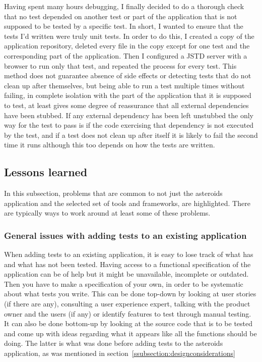\documentclass[11pt]{article}
\begin{document}
Having spent many hours debugging, I finally decided to do a thorough check that no test depended on another test or part of the application that is not supposed to be tested by a specific test. In short, I wanted to ensure that the tests I'd written were truly unit tests. In order to do this, I created a copy of the application repository, deleted every file in the copy except for one test and the corresponding part of the application. Then I configured a JSTD server with a browser to run only that test, and repeated the process for every test. This method does not guarantee absence of side effects or detecting tests that do not clean up after themselves, but being able to run a test multiple times without failing, in complete isolation with the part of the application that it is supposed to test, at least gives some degree of reassurance that all external dependencies have been stubbed. If any external dependency has been left unstubbed the only way for the test to pass is if the code exercising that dependency is not executed by the test, and if a test does not clean up after itself it is likely to fail the second time it runs although this too depends on how the tests are written.

\subsection{Lessons learned}

In this subsection, problems that are common to not just the asteroids application and the selected set of tools and frameworks, are highlighted. There are typically ways to work around at least some of these problems.

\subsubsection{General issues with adding tests to an existing application}

When adding tests to an existing application, it is easy to lose track of what has and what has not been tested. Having access to a functional specification of the application can be of help but it might be unavailable, incomplete or outdated. Then you have to make a specification of your own, in order to be systematic about what tests you write. This can be done top-down by looking at user stories (if there are any), consulting a user experience expert, talking with the product owner and the users (if any) or identify features to test through manual testing. It can also be done bottom-up by looking at the source code that is to be tested and come up with ideas regarding what it appears like all the functions should be doing. The latter is what was done before adding tests to the asteroids application, as was mentioned in section~\ref{ssubsection:designconsiderations}
\end{document}

